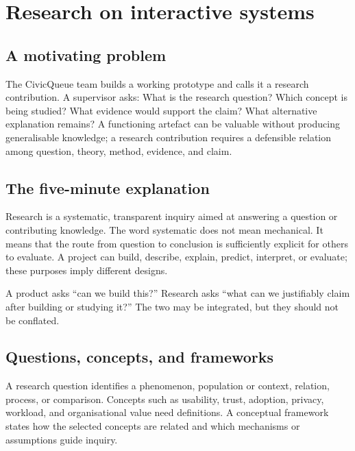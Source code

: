 \chapter{Research on interactive systems}
\label{ch:research}

\section{A motivating problem}
The CivicQueue team builds a working prototype and calls it a research contribution. A supervisor asks: What is the research question? Which concept is being studied? What evidence would support the claim? What alternative explanation remains? A functioning artefact can be valuable without producing generalisable knowledge; a research contribution requires a defensible relation among question, theory, method, evidence, and claim.


\section{The five-minute explanation}
Research is a systematic, transparent inquiry aimed at answering a question or contributing knowledge. The word systematic does not mean mechanical. It means that the route from question to conclusion is sufficiently explicit for others to evaluate. A project can build, describe, explain, predict, interpret, or evaluate; these purposes imply different designs.

A product asks \enquote{can we build this?} Research asks \enquote{what can we justifiably claim after building or studying it?} The two may be integrated, but they should not be conflated.

\section{Questions, concepts, and frameworks}
A research question identifies a phenomenon, population or context, relation, process, or comparison. Concepts such as usability, trust, adoption, privacy, workload, and organisational value need definitions. A conceptual framework states how the selected concepts are related and which mechanisms or assumptions guide inquiry.

